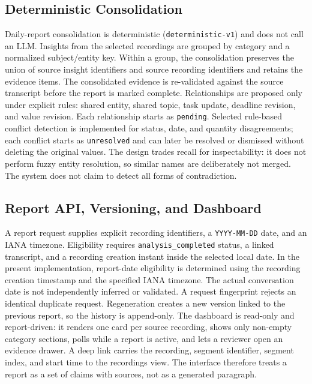 \documentclass[conference,a4paper]{IEEEtran}
\newcommand{\code}[1]{\texttt{#1}}
\begin{document}
\subsection{Deterministic Consolidation}

Daily-report consolidation is deterministic (\code{deterministic-v1}) and does not call an
LLM. Insights from the selected recordings are grouped by category and a normalized
subject/entity key. Within a group, the consolidation preserves the union of source insight
identifiers and source recording identifiers and retains the evidence items. The
consolidated evidence is re-validated against the source transcript before the report is
marked complete. Relationships are proposed only under explicit rules: shared entity,
shared topic, task update, deadline revision, and value revision. Each relationship starts
as \code{pending}. Selected rule-based conflict detection is implemented for status, date,
and quantity disagreements; each conflict starts as \code{unresolved} and can later be
resolved or dismissed without deleting the original values. The design trades recall for
inspectability: it does not perform fuzzy entity resolution, so similar names are
deliberately not merged. The system does not claim to detect all forms of contradiction.

\subsection{Report API, Versioning, and Dashboard}

A report request supplies explicit recording identifiers, a \code{YYYY-MM-DD} date, and an
IANA timezone. Eligibility requires \code{analysis\_completed} status, a linked transcript,
and a recording creation instant inside the selected local date. In the present
implementation, report-date eligibility is determined using the recording creation
timestamp and the specified IANA timezone. The actual conversation date is not
independently inferred or validated. A request fingerprint rejects an identical duplicate
request. Regeneration creates a new version linked to the
previous report, so the history is append-only. The dashboard is read-only and
report-driven: it renders one card per source recording, shows only non-empty category
sections, polls while a report is active, and lets a reviewer open an evidence drawer. A
deep link carries the recording, segment identifier, segment index, and start time to the
recordings view. The interface therefore treats a report as a set of claims with sources,
not as a generated paragraph.
\end{document}
